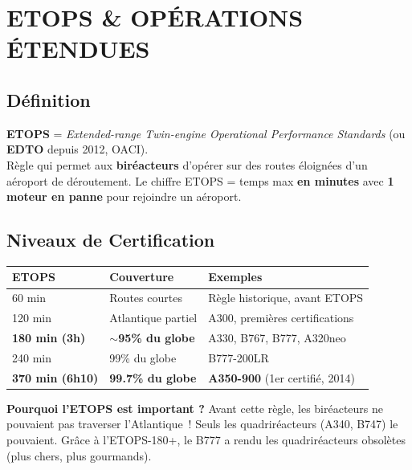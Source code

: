 
\section{ETOPS \& OPÉRATIONS ÉTENDUES}

\subsection{Définition}
\textbf{ETOPS} = \textit{Extended-range Twin-engine Operational Performance Standards} (ou \textbf{EDTO} depuis 2012, OACI).\\
Règle qui permet aux \textbf{biréacteurs} d'opérer sur des routes éloignées d'un aéroport de déroutement. Le chiffre ETOPS = temps max \textbf{en minutes} avec \textbf{1 moteur en panne} pour rejoindre un aéroport.

\subsection{Niveaux de Certification}

\begin{tabular}{p{3cm}p{3cm}p{8.5cm}}
\toprule
\textbf{ETOPS} & \textbf{Couverture} & \textbf{Exemples} \\
\midrule
60 min & Routes courtes & Règle historique, avant ETOPS \\
120 min & Atlantique partiel & A300, premières certifications \\
\rowcolor{aflight}
\textbf{180 min (3h)} & \textbf{$\sim$95\% du globe} & A330, B767, B777, A320neo \\
240 min & 99\% du globe & B777-200LR \\
\rowcolor{aflight}
\textbf{370 min (6h10)} & \textbf{99.7\% du globe} & \textbf{A350-900} (1er certifié, 2014) \\
\bottomrule
\end{tabular}

\begin{memobox}
\textbf{Pourquoi l'ETOPS est important ?} Avant cette règle, les biréacteurs ne pouvaient pas traverser l'Atlantique~! Seuls les quadriréacteurs (A340, B747) le pouvaient. Grâce à l'ETOPS-180+, le B777 a rendu les quadriréacteurs obsolètes (plus chers, plus gourmands).
\end{memobox}

